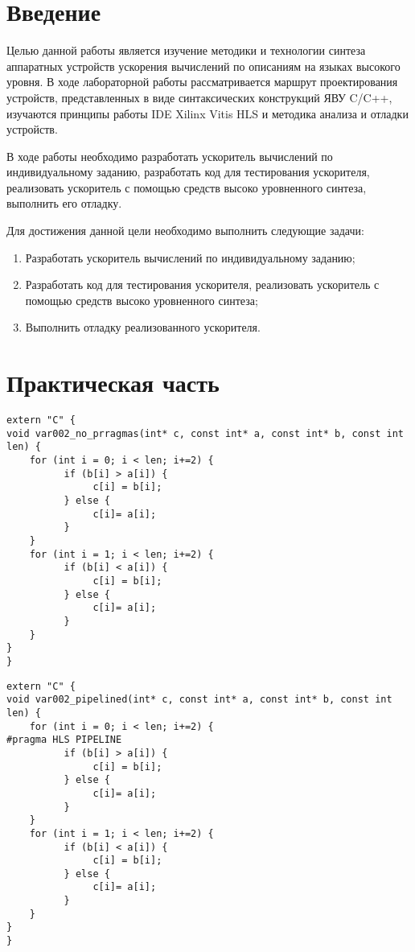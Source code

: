 \chapter{Введение}
Целью данной работы является изучение методики и технологии синтеза аппаратных устройств ускорения вычислений по описаниям на языках высокого уровня. В ходе лабораторной работы рассматривается маршрут проектирования устройств, представленных в виде синтаксических конструкций ЯВУ C/C++, изучаются принципы работы IDE Xilinx Vitis HLS и методика анализа и отладки устройств. 


В ходе работы необходимо разработать ускоритель вычислений по индивидуальному заданию, разработать код для тестирования ускорителя, реализовать ускоритель с помощью средств высоко уровненного синтеза, выполнить его отладку.

Для достижения данной цели необходимо выполнить следующие задачи:
\begin{enumerate}
	\item Разработать ускоритель вычислений по индивидуальному заданию;
	\item Разработать код для тестирования ускорителя, реализовать ускоритель с помощью средств высоко уровненного синтеза;
	\item Выполнить отладку реализованного ускорителя.
\end{enumerate}

\chapter{Практическая часть}

\begin{lstlisting}[label=some-code-1,caption=Листинг неоптимизированного кода]
extern "C" {
void var002_no_prragmas(int* c, const int* a, const int* b, const int len) {
    for (int i = 0; i < len; i+=2) {
          if (b[i] > a[i]) {
               c[i] = b[i];
          } else {
               c[i]= a[i];
          }
    }
    for (int i = 1; i < len; i+=2) {
          if (b[i] < a[i]) {
               c[i] = b[i];
          } else {
               c[i]= a[i];
          }
    }
}
}
\end{lstlisting}

\begin{lstlisting}[label=some-code-1,caption=Листинг кода с конвейерной организацией]
extern "C" {
void var002_pipelined(int* c, const int* a, const int* b, const int len) {
    for (int i = 0; i < len; i+=2) {
#pragma HLS PIPELINE
          if (b[i] > a[i]) {
               c[i] = b[i];
          } else {
               c[i]= a[i];
          }
    }
    for (int i = 1; i < len; i+=2) {
          if (b[i] < a[i]) {
               c[i] = b[i];
          } else {
               c[i]= a[i];
          }
    }
}
}
\end{lstlisting}

